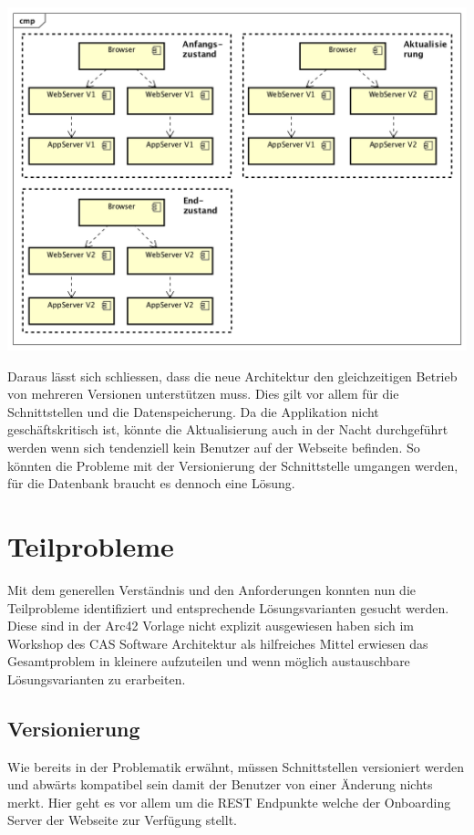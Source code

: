 \begin{center}
	\includegraphics[scale=0.55]{MultiVersion.png}
\end{center}

Daraus lässt sich schliessen, dass die neue Architektur den gleichzeitigen Betrieb von mehreren Versionen unterstützen muss. Dies gilt vor allem für die Schnittstellen und die Datenspeicherung. Da die Applikation nicht geschäftskritisch ist, könnte die Aktualisierung auch in der Nacht durchgeführt werden wenn sich tendenziell kein Benutzer auf der Webseite befinden. So könnten die Probleme mit der Versionierung der Schnittstelle umgangen werden, für die Datenbank braucht es dennoch eine Lösung.	

\section{Teilprobleme}

Mit dem generellen Verständnis und den Anforderungen konnten nun die Teilprobleme identifiziert und entsprechende Lösungsvarianten gesucht werden. Diese sind in der Arc42 Vorlage nicht explizit ausgewiesen haben sich im Workshop des CAS Software Architektur als hilfreiches Mittel erwiesen das Gesamtproblem in kleinere aufzuteilen und wenn möglich austauschbare Lösungsvarianten zu erarbeiten.

\subsection{Versionierung}

Wie bereits in der Problematik erwähnt, müssen Schnittstellen versioniert werden und abwärts kompatibel sein damit der Benutzer von einer Änderung nichts merkt. Hier geht es vor allem um die REST Endpunkte welche der Onboarding Server der Webseite zur Verfügung stellt.

